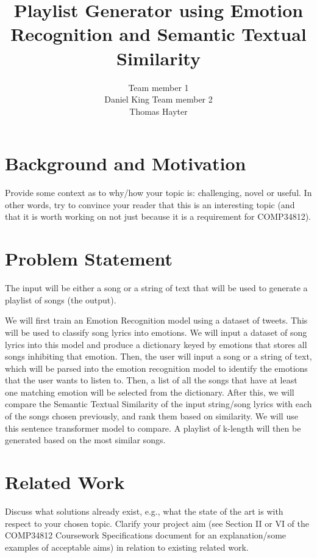 \documentclass[11pt]{article}
\title{Playlist Generator using Emotion Recognition and Semantic Textual Similarity}
\author{
    Team member 1 \\
    Daniel King
    \And
    Team member 2 \\
    Thomas Hayter
}
\begin{document}
\maketitle


\section{Background and Motivation}

Provide some context as to why/how your topic is: challenging, novel or useful. In other words, try to convince your reader that this is an interesting topic (and that it is worth working on not just because it is a requirement for COMP34812).

\section{Problem Statement}

The input will be either a song or a string of text that will be used to generate a playlist of songs (the output).

We will first train an Emotion Recognition model using a dataset of tweets\cite{gupta_2021}\cite{pandey_2022}. This will be used to classify song lyrics into emotions. We will input a dataset of song lyrics\cite{shah_2021} into this model and produce a dictionary keyed by emotions that stores all songs inhibiting that emotion.
Then, the user will input a song or a string of text, which will be parsed into the emotion recognition model to identify the emotions that the user wants to listen to. Then, a list of all the songs that have at least one matching emotion will be selected from the dictionary. After this, we will compare the Semantic Textual Similarity of the input string/song lyrics with each of the songs chosen previously, and rank them based on similarity. We will use this\cite{sentence-transformer} sentence transformer model to compare. A playlist of k-length will then be generated based on the most similar songs.

\section{Related Work}
Discuss what solutions already exist, e.g., what the state of the art is with respect to your chosen topic. Clarify your project aim (see Section II or VI of the COMP34812 Coursework Specifications document for an explanation/some examples of acceptable aims) in relation to existing related work.
\end{document}

